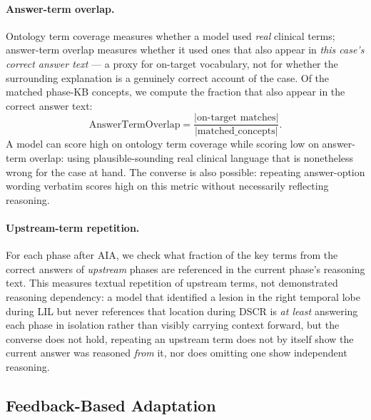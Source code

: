 \documentclass[11pt]{article}
\begin{document}
\paragraph{Answer-term overlap.} Ontology term coverage measures whether a model used \emph{real} clinical terms; answer-term overlap measures whether it used ones that also appear in \emph{this case's correct answer text} — a proxy for on-target vocabulary, not for whether the surrounding explanation is a genuinely correct account of the case. Of the matched phase-KB concepts, we compute the fraction that also appear in the correct answer text:
\begin{equation}
  \label{eq:concept-precision}
  \text{AnswerTermOverlap} = \frac{|\text{on-target matches}|}{|\text{matched\_concepts}|}.
\end{equation}
A model can score high on ontology term coverage while scoring low on answer-term overlap: using plausible-sounding real clinical language that is nonetheless wrong for the case at hand. The converse is also possible: repeating answer-option wording verbatim scores high on this metric without necessarily reflecting reasoning.

\paragraph{Upstream-term repetition.} For each phase after AIA, we check what fraction of the key terms from the correct answers of \emph{upstream} phases are referenced in the current phase's reasoning text. This measures textual repetition of upstream terms, not demonstrated reasoning dependency: a model that identified a lesion in the right temporal lobe during LIL but never references that location during DSCR is \emph{at least} answering each phase in isolation rather than visibly carrying context forward, but the converse does not hold, repeating an upstream term does not by itself show the current answer was reasoned \emph{from} it, nor does omitting one show independent reasoning.

\subsection{Feedback-Based Adaptation}
\end{document}
